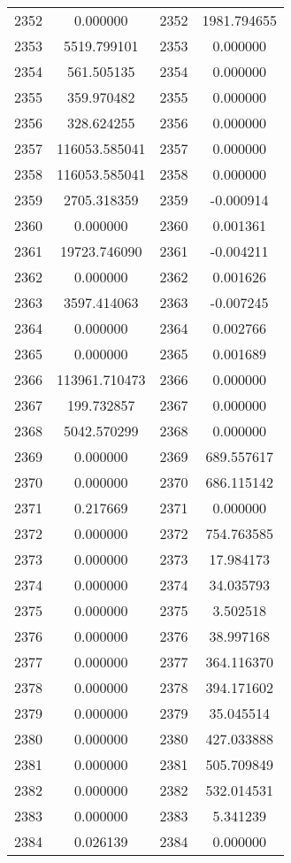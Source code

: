 \documentclass[12pt]{article}
\begin{document}
\begin{longtable}{@{}cccc@{}}
2352 & 0.000000 & 2352 & 1981.794655 \\
2353 & 5519.799101 & 2353 & 0.000000 \\
2354 & 561.505135 & 2354 & 0.000000 \\
2355 & 359.970482 & 2355 & 0.000000 \\
2356 & 328.624255 & 2356 & 0.000000 \\
2357 & 116053.585041 & 2357 & 0.000000 \\
2358 & 116053.585041 & 2358 & 0.000000 \\
2359 & 2705.318359 & 2359 & -0.000914 \\
2360 & 0.000000 & 2360 & 0.001361 \\
2361 & 19723.746090 & 2361 & -0.004211 \\
2362 & 0.000000 & 2362 & 0.001626 \\
2363 & 3597.414063 & 2363 & -0.007245 \\
2364 & 0.000000 & 2364 & 0.002766 \\
2365 & 0.000000 & 2365 & 0.001689 \\
2366 & 113961.710473 & 2366 & 0.000000 \\
2367 & 199.732857 & 2367 & 0.000000 \\
2368 & 5042.570299 & 2368 & 0.000000 \\
2369 & 0.000000 & 2369 & 689.557617 \\
2370 & 0.000000 & 2370 & 686.115142 \\
2371 & 0.217669 & 2371 & 0.000000 \\
2372 & 0.000000 & 2372 & 754.763585 \\
2373 & 0.000000 & 2373 & 17.984173 \\
2374 & 0.000000 & 2374 & 34.035793 \\
2375 & 0.000000 & 2375 & 3.502518 \\
2376 & 0.000000 & 2376 & 38.997168 \\
2377 & 0.000000 & 2377 & 364.116370 \\
2378 & 0.000000 & 2378 & 394.171602 \\
2379 & 0.000000 & 2379 & 35.045514 \\
2380 & 0.000000 & 2380 & 427.033888 \\
2381 & 0.000000 & 2381 & 505.709849 \\
2382 & 0.000000 & 2382 & 532.014531 \\
2383 & 0.000000 & 2383 & 5.341239 \\
2384 & 0.026139 & 2384 & 0.000000 \\

\end{longtable}
\end{document}

